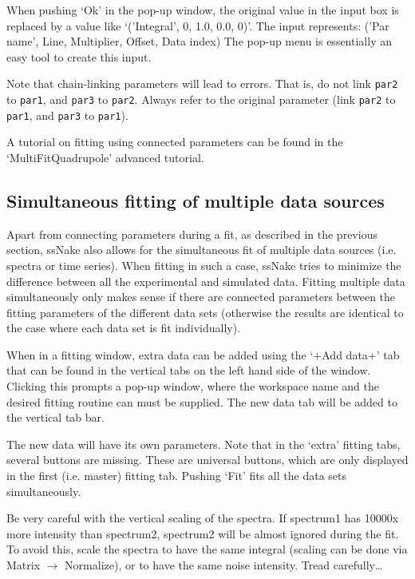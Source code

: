 \documentclass[11pt,a4paper]{article}
\begin{document}
When pushing `Ok' in the pop-up window, the original value in the input box is replaced by a value
like `('Integral', 0, 1.0, 0.0, 0)'. The input represents: ('Par name', Line, Multiplier, Offset,
Data index) The pop-up menu is essentially an easy tool to create this input.

Note that chain-linking parameters will lead to errors. That is, do not link \texttt{par2} to
\texttt{par1}, and \texttt{par3}
to \texttt{par2}. Always refer to the original parameter (link \texttt{par2} to \texttt{par1}, and
\texttt{par3} to \texttt{par1}).

A tutorial on fitting using connected parameters can be found in the `MultiFitQuadrupole' advanced
tutorial. 


\subsection{Simultaneous fitting of multiple data sources}
Apart from connecting parameters during a fit, as described in the previous section, ssNake also
allows for the simultaneous fit of multiple data sources (i.e. spectra or time series). When fitting
in such a case, ssNake tries to minimize the difference between all the experimental and simulated
data. Fitting multiple data simultaneously only makes sense if there are connected parameters between
the fitting parameters of the different data sets (otherwise the results are identical to the case
where each data set is fit individually).

When in a fitting window, extra data can be added using the `+Add data+' tab that can be found in
the vertical tabs on the left hand side of the window. Clicking this prompts a pop-up window, where
the workspace name and the desired fitting routine can must be supplied. The new data tab will be
added to the vertical tab bar.

The new data will have its own parameters. Note that in the `extra' fitting tabs, several buttons are
missing. These are universal buttons, which are only displayed in the first (i.e. master) fitting
tab. Pushing `Fit' fits all the data sets simultaneously.

Be very careful with the vertical scaling of the spectra. If spectrum1 has 10000x more intensity
than spectrum2, spectrum2 will be almost ignored during the fit. To avoid this, scale the spectra to
have the same integral (scaling can be done via Matrix $\longrightarrow$ Normalize), or to have the
same noise intensity. Tread carefully\ldots
\end{document}
